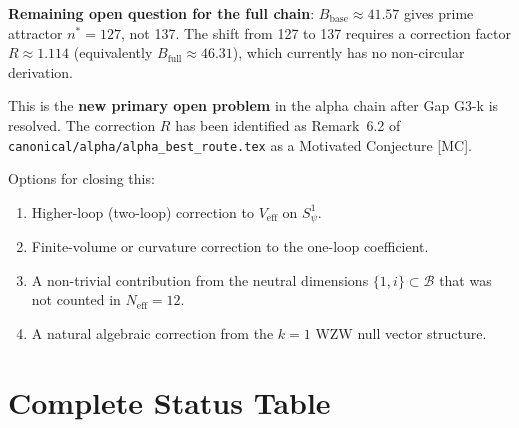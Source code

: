 \documentclass[12pt,a4paper]{article}
\theoremstyle{definition}
\theoremstyle{remark}
\begin{document}
\begin{gapbox}
\textbf{Remaining open question for the full chain}:
$B_{\mathrm{base}} \approx 41.57$ gives prime attractor $n^* = 127$, not 137.
The shift from 127 to 137 requires a correction factor $R \approx 1.114$
(equivalently $B_{\mathrm{full}} \approx 46.31$), which currently has no
non-circular derivation.

This is the \textbf{new primary open problem} in the alpha chain after
Gap G3-k is resolved.  The correction $R$ has been identified as Remark~6.2
of \texttt{canonical/alpha/alpha\_best\_route.tex} as a Motivated Conjecture [MC].

Options for closing this:
\begin{enumerate}
  \item Higher-loop (two-loop) correction to $V_{\mathrm{eff}}$ on $S^1_\psi$.
  \item Finite-volume or curvature correction to the one-loop coefficient.
  \item A non-trivial contribution from the neutral dimensions $\{1, i\}\subset\mathcal{B}$
        that was not counted in $N_{\mathrm{eff}} = 12$.
  \item A natural algebraic correction from the $k=1$ WZW null vector structure.
\end{enumerate}
\end{gapbox}

\section{Complete Status Table}
\label{sec:g3k:table}
\end{document}
